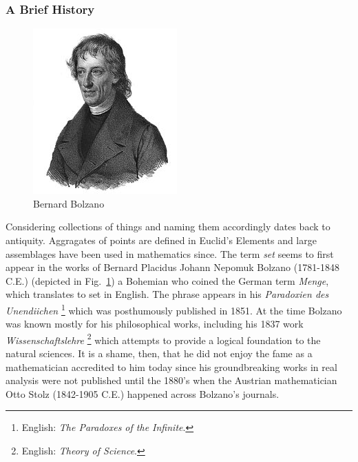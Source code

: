         \subsubsection{A Brief History}
            \begin{figure}
                \centering
                \captionsetup{type=figure}
                \includegraphics{images/BernardBolzano.jpg}
                \caption{Bernard Bolzano}
                \label{fig:ImageOfBernardBolzano}
            \end{figure}
            Considering collections of things and naming them accordingly
            dates back to antiquity. Aggragates of points are defined in
            Euclid's Elements and large assemblages have been used in
            mathematics since. The term \textit{set} seems to first appear
            in the works of Bernard Placidus Johann Nepomuk Bolzano
            (1781-1848 C.E.) (depicted in Fig.~\ref{fig:ImageOfBernardBolzano})
            a Bohemian who coined the German term \textit{Menge}, which
            translates to set in English. The phrase
            appears in his \textit{Paradoxien des Unendiichen}%
            \footnote{English: \textit{The Paradoxes of the Infinite}.}
            which was posthumously published in 1851. At the time Bolzano
            was known mostly for his philosophical works, including his 1837
            work \textit{Wissenschaftslehre}%
            \footnote{English: \textit{Theory of Science}.}
            which attempts to provide a logical foundation to the natural
            sciences.
            It is a shame, then, that he did not enjoy the fame as a
            mathematician accredited to him today since his groundbreaking works
            in real analysis were not published until the 1880's when the
            Austrian mathematician Otto Stolz
            (1842-1905 C.E.) happened across Bolzano's journals.
